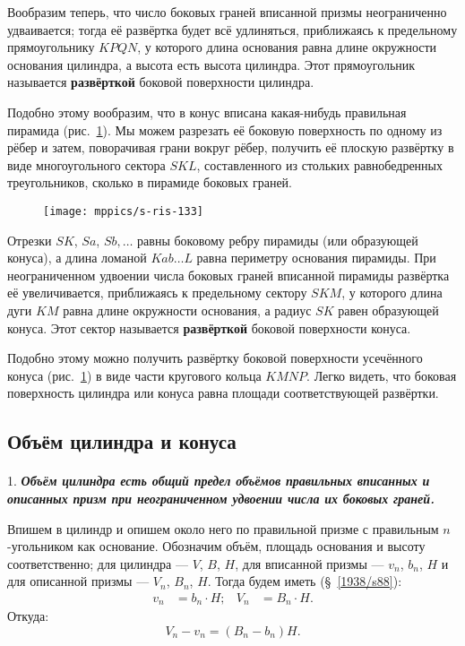 Вообразим теперь, что число боковых граней вписанной призмы неограниченно удваивается;
тогда её развёртка будет всё удлиняться, приближаясь к предельному прямоугольнику $KPQN$, у которого длина основания равна длине окружности основания цилиндра, а высота есть высота цилиндра.
Этот прямоугольник называется \textbf{развёрткой} боковой поверхности цилиндра.

Подобно этому вообразим, что в конус вписана какая-нибудь правильная пирамида (рис.~\ref{1938/s-ris-133}).
Мы можем разрезать её боковую поверхность по одному из рёбер и затем, поворачивая грани вокруг рёбер, получить её плоскую развёртку в виде многоугольного сектора $SKL$, составленного из стольких равнобедренных треугольников, сколько в пирамиде боковых граней.
\begin{figure}[h!]
\vskip-0mm
\centering
\texttt{[image: mppics/s-ris-133]}
\caption{}\label{1938/s-ris-133}
\vskip-0mm
\end{figure}
Отрезки $SK$, $Sa$, $Sb,\dots$ равны боковому ребру пирамиды (или образующей конуса), а длина ломаной $Kab\dots L$ равна периметру основания пирамиды.
При неограниченном удвоении числа боковых граней вписанной пирамиды развёртка её увеличивается, приближаясь к предельному сектору $SKM$, у которого длина дуги $KM$ равна длине окружности основания, а радиус $SK$ равен образующей конуса.
Этот сектор называется \textbf{развёрткой} боковой поверхности конуса.

Подобно этому можно получить развёртку боковой поверхности усечённого конуса (рис.~\ref{1938/s-ris-133}) в виде части кругового кольца $KMNP$.
Легко видеть, что боковая поверхность цилиндра или конуса равна площади соответствующей развёртки.



\subsection*{Объём цилиндра и конуса}

\paragraph{}\label{1914/470}  1. 
\textbf{\emph{Объём цилиндра есть общий предел объёмов правильных вписанных и описанных призм при неограниченном удвоении числа их боковых граней.}}


Впишем в цилиндр и опишем около него по правильной призме с правильным $n$-угольником как основание.
Обозначим объём, площадь основания и высоту соответственно; 
для цилиндра — $V$, $B$, $H$, 
для вписанной призмы — $v_n$, $b_n$, $H$ 
и для описанной призмы — $V_n$, $B_n$, $H$.
Тогда будем иметь (§~\ref{1938/s88}): 
\begin{align*}
v_n&=b_n\cdot H;
&
V_n&=B_n\cdot H.
\end{align*}
Откуда:
\[V_n-v_n=(B_n-b_n)H.\]

